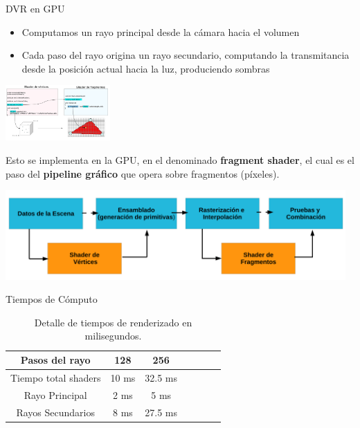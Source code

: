 \documentclass[spanish,unknownkeysallowed]{beamer}
\begin{document}
\begin{frame}{DVR en GPU}

\begin{itemize}
\item Computamos un rayo principal desde la cámara hacia el volumen
\item Cada paso del rayo origina un rayo secundario, computando la transmitancia desde la posición actual hacia la luz, produciendo sombras
\end{itemize}

\centerline{\includegraphics[width=4cm]{../figures/fragmentshader}}

\end{frame}

\begin{frame}
Esto se implementa en la GPU, en el denominado \textbf{fragment shader}, el cual es el paso del \textbf{pipeline gráfico} que opera sobre fragmentos (píxeles).

\centerline{\includegraphics[width=13cm]{../figures/pipelinegrafico}}
\end{frame}

\begin{frame}{Tiempos de Cómputo}

\begin{table}[htb]
\centering

\begin{tabular}{|c|c|c|c|c|c|c|}
\hline
 Pasos del rayo         & 128 &  256 \\
\hline
\hline
 Tiempo total shaders   & 10 ms &  32.5 ms \\
\hline
 Rayo Principal         & 2 ms  & 5 ms  \\
\hline
 Rayos Secundarios      &  8 ms & 27.5 ms  \\
\hline
\end{tabular}
\caption{Detalle de tiempos de renderizado en milisegundos.}
\label{tab:n2}
\end{table}


\end{frame}
\end{document}
